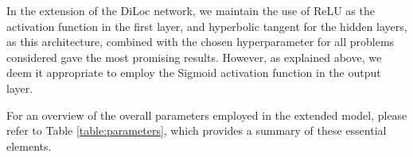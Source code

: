 \documentclass[a4paper, UKenglish, 11pt]{uiomaster}
\begin{document}
In the extension of the DiLoc network, we maintain the use of ReLU as the activation function in the first layer, and hyperbolic tangent for the hidden layers, as this architecture, combined with the chosen hyperparameter for all problems considered gave the most promising results. However, as explained above, we deem it appropriate to employ the Sigmoid activation function in the output layer.

For an overview of the overall parameters employed in the extended model, please refer to Table \ref{table:parameters}, which provides a summary of these essential elements.
\end{document}
